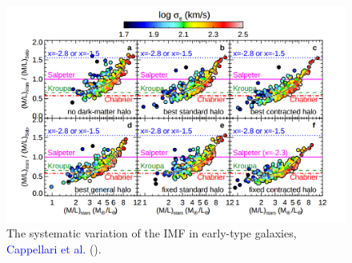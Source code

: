 \begin{appendices}
\begin{figure}[H]
\centering
\includegraphics[width=12cm]{images/IMFs_paper.png}
\caption[The systematic variation of the IMF in early-type galaxies.]{The systematic variation of the IMF in early-type galaxies, \textcolor{blue}{Cappellari et al.} (\citeyear{Reference19}).}
\end{figure}
 
\end{appendices}